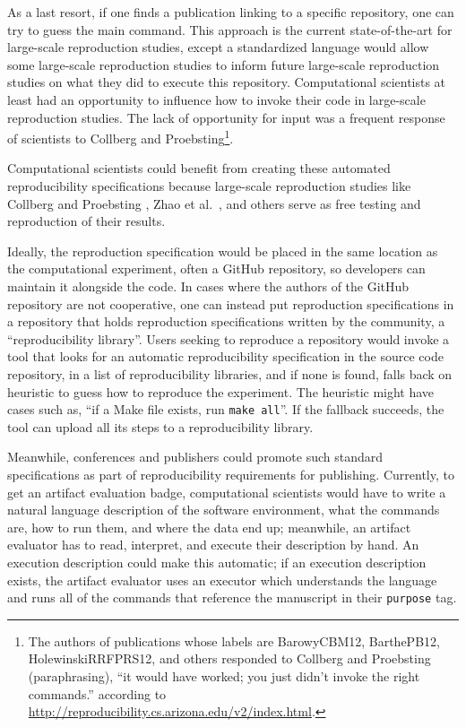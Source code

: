 \documentclass[manuscript]{acmart}
\begin{document}
As a last resort, if one finds a publication linking to a specific
repository, one can try to guess the main command. This approach is the
current state-of-the-art for large-scale reproduction studies, except a
standardized language would allow some large-scale reproduction studies
to inform future large-scale reproduction studies on what they did to
execute this repository. Computational scientists at least had an
opportunity to influence how to invoke their code in large-scale
reproduction studies. The lack of opportunity for input was a frequent
response of scientists to Collberg and Proebsting\footnote{The authors
  of publications whose labels are BarowyCBM12, BarthePB12,
  HolewinskiRRFPRS12, and others responded to Collberg and Proebsting
  (paraphrasing), ``it would have worked; you just didn't invoke the
  right commands.'' according to
  \url{http://reproducibility.cs.arizona.edu/v2/index.html}.}.

Computational scientists could benefit from creating these automated
reproducibility specifications because large-scale reproduction studies
like Collberg and Proebsting \cite{collberg_repeatability_2016}, Zhao et
al.~\cite{zhao_why_2012}, and others serve as free testing and
reproduction of their results.

Ideally, the reproduction specification would be placed in the same
location as the computational experiment, often a GitHub repository, so
developers can maintain it alongside the code. In cases where the
authors of the GitHub repository are not cooperative, one can instead
put reproduction specifications in a repository that holds reproduction
specifications written by the community, a ``reproducibility library''.
Users seeking to reproduce a repository would invoke a tool that looks
for an automatic reproducibility specification in the source code
repository, in a list of reproducibility libraries, and if none is
found, falls back on heuristic to guess how to reproduce the experiment.
The heuristic might have cases such as, ``if a Make file exists, run
\texttt{make\ all}''. If the fallback succeeds, the tool can upload all
its steps to a reproducibility library.

Meanwhile, conferences and publishers could promote such standard
specifications as part of reproducibility requirements for publishing.
Currently, to get an artifact evaluation badge, computational scientists
would have to write a natural language description of the software
environment, what the commands are, how to run them, and where the data
end up; meanwhile, an artifact evaluator has to read, interpret, and
execute their description by hand. An execution description could make
this automatic; if an execution description exists, the artifact
evaluator uses an executor which understands the language and runs all
of the commands that reference the manuscript in their \texttt{purpose}
tag.
\end{document}
